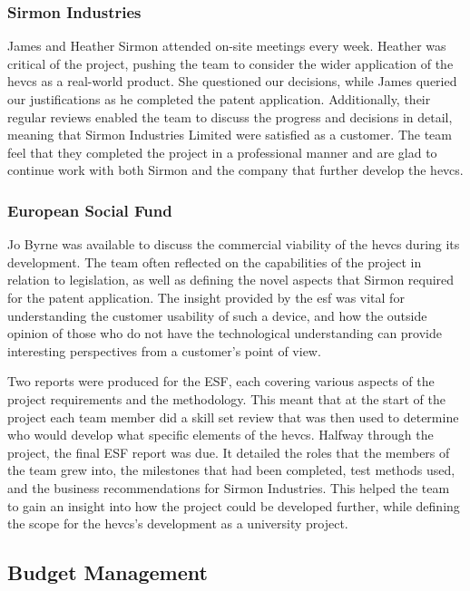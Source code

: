 \documentclass [12pt]{article}
\begin{document}
\subsubsection{Sirmon Industries}
James and Heather Sirmon attended on-site meetings every week. Heather was critical of the project, pushing the team to consider the wider application of the \gls{hevcs} as a real-world product. She questioned our decisions, while James queried our justifications as he completed the patent application. Additionally, their regular reviews enabled the team to discuss the progress and decisions in detail, meaning that Sirmon Industries Limited were satisfied as a customer. The team feel that they completed the project in a professional manner and are glad to continue work with both Sirmon and the company that further develop the \gls{hevcs}.

\subsubsection{European Social Fund}
Jo Byrne was available to discuss the commercial viability of the \gls{hevcs} during its development. The team often reflected on the capabilities of the project in relation to legislation, as well as defining the novel aspects that Sirmon required for the patent application. The insight provided by the \gls{esf} was vital for understanding the customer usability of such a device, and how the outside opinion of those who do not have the technological understanding can provide interesting perspectives from a customer’s point of view.

Two reports were produced for the ESF, each covering various aspects of the project requirements and the methodology. This meant that at the start of the project each team member did a skill set review that was then used to determine who would develop what specific elements of the \gls{hevcs}. Halfway through the project, the final ESF report was due. It detailed the roles that the members of the team grew into, the milestones that had been completed, test methods used, and the business recommendations for Sirmon Industries. This helped the team to gain an insight into how the project could be developed further, while defining the scope for the \gls{hevcs}’s development as a university project.

\subsection{Budget Management}
\end{document}
